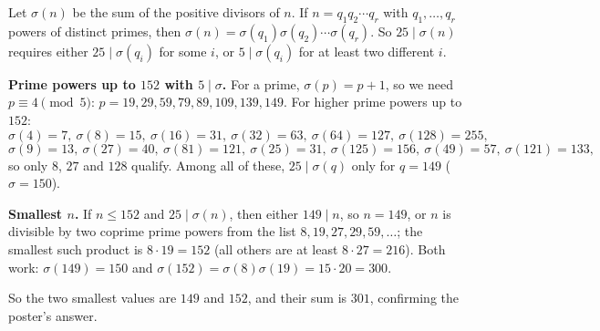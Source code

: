 Let $\sigma(n)$ be the sum of the positive divisors of $n$. If $n=q_1q_2\cdots q_r$ with $q_1,\dots,q_r$ powers of distinct primes, then $\sigma(n)=\sigma(q_1)\sigma(q_2)\cdots\sigma(q_r)$. So $25\mid\sigma(n)$ requires either $25\mid\sigma(q_i)$ for some $i$, or $5\mid\sigma(q_i)$ for at least two different $i$.

\textbf{Prime powers up to $152$ with $5\mid\sigma$.} For a prime, $\sigma(p)=p+1$, so we need $p\equiv4\pmod5$: $p=19,29,59,79,89,109,139,149$. For higher prime powers up to $152$:
\[\sigma(4)=7,\ \sigma(8)=15,\ \sigma(16)=31,\ \sigma(32)=63,\ \sigma(64)=127,\ \sigma(128)=255,\]
\[\sigma(9)=13,\ \sigma(27)=40,\ \sigma(81)=121,\ \sigma(25)=31,\ \sigma(125)=156,\ \sigma(49)=57,\ \sigma(121)=133,\]
so only $8$, $27$ and $128$ qualify. Among all of these, $25\mid\sigma(q)$ only for $q=149$ ($\sigma=150$).

\textbf{Smallest $n$.} If $n\le152$ and $25\mid\sigma(n)$, then either $149\mid n$, so $n=149$, or $n$ is divisible by two coprime prime powers from the list $8,19,27,29,59,\dots$; the smallest such product is $8\cdot19=152$ (all others are at least $8\cdot27=216$). Both work: $\sigma(149)=150$ and $\sigma(152)=\sigma(8)\sigma(19)=15\cdot20=300$.

So the two smallest values are $149$ and $152$, and their sum is $\boxed{301}$, confirming the poster's answer.
